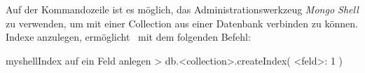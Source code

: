 Auf der Kommandozeile ist es möglich, das Administrationswerkzeug \textit{Mongo Shell} zu verwenden, um mit einer Collection aus einer Datenbank verbinden zu können. Indexe anzulegen, ermöglicht \mongo\ mit dem folgenden Befehl: 
\begin{listingsboxShell}[label={lst:createIndex}]{myshell}{Index auf ein Feld anlegen}
> db.<collection>.createIndex( {<feld>: 1} )
\end{listingsboxShell}
%
%
%
%
%
%
%
%
%
